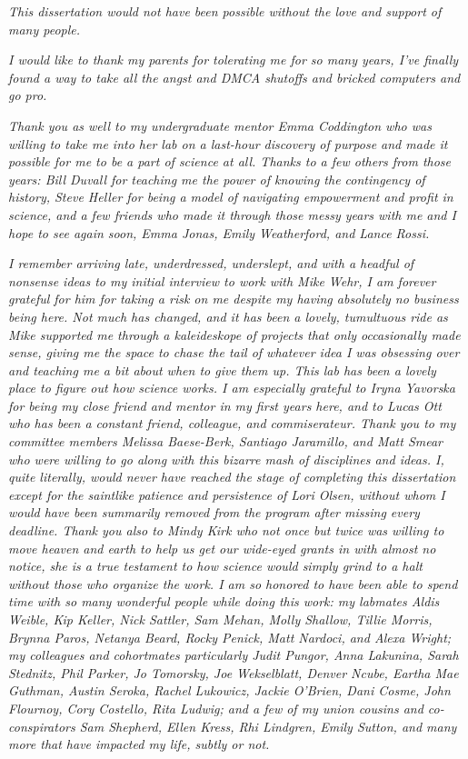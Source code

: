 \begin{acknowledgements}
\textit{This dissertation would not have been possible without the love and support of many people.}

\textit{I would like to thank my parents for tolerating me for so many years, I've finally found a way to take all the angst and DMCA shutoffs and bricked computers and go pro.}

\textit{Thank you as well to my undergraduate mentor Emma Coddington who was willing to take me into her lab on a last-hour discovery of purpose and made it possible for me to be a part of science at all. Thanks to a few others from those years: Bill Duvall for teaching me the power of knowing the contingency of history, Steve Heller for being a model of navigating empowerment and profit in science, and a few friends who made it through those messy years with me and I hope to see again soon, Emma Jonas, Emily Weatherford, and Lance Rossi.}

\textit{I remember arriving late, underdressed, underslept, and with a headful of nonsense ideas to my initial interview to work with Mike Wehr, I am forever grateful for him for taking a risk on me despite my having absolutely no business being here. Not much has changed, and it has been a lovely, tumultuous ride as Mike supported me through a kaleideskope of projects that only occasionally made sense, giving me the space to chase the tail of whatever idea I was obsessing over and teaching me a bit about when to give them up. This lab has been a lovely place to figure out how science works. I am especially grateful to Iryna Yavorska for being my close friend and mentor in my first years here, and to Lucas Ott who has been a constant friend, colleague, and commiserateur. Thank you to my committee members Melissa Baese-Berk, Santiago Jaramillo, and Matt Smear who were willing to go along with this bizarre mash of disciplines and ideas. I, quite literally, would never have reached the stage of completing this dissertation except for the saintlike patience and persistence of Lori Olsen, without whom I would have been summarily removed from the program after missing every deadline. Thank you also to Mindy Kirk who not once but twice was willing to move heaven and earth to help us get our wide-eyed grants in with almost no notice, she is a true testament to how science would simply grind to a halt without those who organize the work. I am so honored to have been able to spend time with so many wonderful people while doing this work: my labmates Aldis Weible, Kip Keller, Nick Sattler, Sam Mehan, Molly Shallow, Tillie Morris, Brynna Paros, Netanya Beard, Rocky Penick, Matt Nardoci, and Alexa Wright; my colleagues and cohortmates particularly Judit Pungor, Anna Lakunina, Sarah Stednitz, Phil Parker, Jo Tomorsky, Joe Wekselblatt, Denver Ncube, Eartha Mae Guthman, Austin Seroka, Rachel Lukowicz, Jackie O'Brien, Dani Cosme, John Flournoy, Cory Costello, Rita Ludwig; and a few of my union cousins and co-conspirators Sam Shepherd, Ellen Kress, Rhi Lindgren, Emily Sutton, and many more that have impacted my life, subtly or not.}


\end{acknowledgements}
